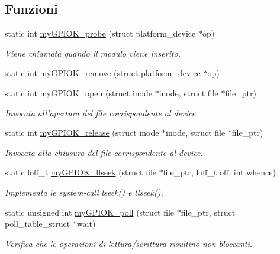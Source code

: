 \subsection*{Funzioni}
\begin{DoxyCompactItemize}
\item 
static int \hyperlink{group___kernel-_module_gae40973a06d72f7c41a9af07513a62307}{my\+G\+P\+I\+O\+K\+\_\+probe} (struct platform\+\_\+device $\ast$op)
\begin{DoxyCompactList}\small\item\em Viene chiamata quando il modulo viene inserito. \end{DoxyCompactList}\item 
static int \hyperlink{group___kernel-_module_ga59fddfaa36dea357f4bbdfceb0f47f8c}{my\+G\+P\+I\+O\+K\+\_\+remove} (struct platform\+\_\+device $\ast$op)
\item 
static int \hyperlink{group___kernel-_module_gad013759c18fbf6ea96005b9b3bfa5b4e}{my\+G\+P\+I\+O\+K\+\_\+open} (struct inode $\ast$inode, struct file $\ast$file\+\_\+ptr)
\begin{DoxyCompactList}\small\item\em Invocata all'apertura del file corrispondente al device. \end{DoxyCompactList}\item 
static int \hyperlink{group___kernel-_module_ga17ce7f574723246c790b70b06e3e7103}{my\+G\+P\+I\+O\+K\+\_\+release} (struct inode $\ast$inode, struct file $\ast$file\+\_\+ptr)
\begin{DoxyCompactList}\small\item\em Invocata alla chiusura del file corrispondente al device. \end{DoxyCompactList}\item 
static loff\+\_\+t \hyperlink{group___kernel-_module_ga66e7f726b72320a272b633ecbaecefff}{my\+G\+P\+I\+O\+K\+\_\+llseek} (struct file $\ast$file\+\_\+ptr, loff\+\_\+t off, int whence)
\begin{DoxyCompactList}\small\item\em Implementa le system-\/call lseek() e llseek(). \end{DoxyCompactList}\item 
static unsigned int \hyperlink{group___kernel-_module_gaba935e8a8215c2ebce9a7147fd4f5147}{my\+G\+P\+I\+O\+K\+\_\+poll} (struct file $\ast$file\+\_\+ptr, struct poll\+\_\+table\+\_\+struct $\ast$wait)
\begin{DoxyCompactList}\small\item\em Verifica che le operazioni di lettura/scrittura risultino non-\/bloccanti. \end{DoxyCompactList}\item 

\end{DoxyCompactItemize}
